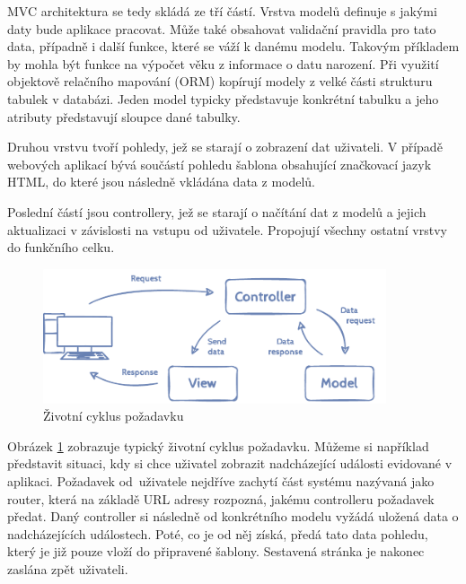 MVC architektura se tedy skládá ze tří částí. Vrstva modelů definuje s jakými daty bude aplikace pracovat. Může také obsahovat validační pravidla pro tato data, případně i další funkce, které se váží k danému modelu. Takovým příkladem by mohla být funkce na výpočet věku z informace o datu narození. Při využití objektově relačního mapování (ORM) kopírují modely z velké části strukturu tabulek v databázi. Jeden model typicky představuje konkrétní tabulku a jeho atributy představují sloupce dané tabulky.

Druhou vrstvu tvoří pohledy, jež se starají o zobrazení dat uživateli. V případě webových aplikací bývá součástí pohledu šablona obsahující značkovací jazyk HTML, do které jsou následně vkládána data z modelů.

Poslední částí jsou controllery, jež se starají o načítání dat z modelů a jejich aktualizaci v závislosti na vstupu od uživatele. Propojují všechny ostatní vrstvy do funkčního celku.

\begin{figure}[h]
	\caption{Životní cyklus požadavku}
	\label{figure:mvc}
	\centering
	\includegraphics[width=0.9\textwidth]{images/mvc.pdf}
\end{figure}

Obrázek \ref{figure:mvc} zobrazuje typický životní cyklus požadavku. Můžeme si například představit situaci, kdy si chce uživatel zobrazit nadcházející události evidované v aplikaci. Požadavek od~uživatele nejdříve zachytí část systému nazývaná jako router, která na základě URL adresy rozpozná, jakému controlleru požadavek předat. Daný controller si následně od konkrétního modelu vyžádá uložená data o nadcházejících událostech. Poté, co je od něj získá, předá tato data pohledu, který je již pouze vloží do připravené šablony. Sestavená stránka je nakonec zaslána zpět uživateli.

